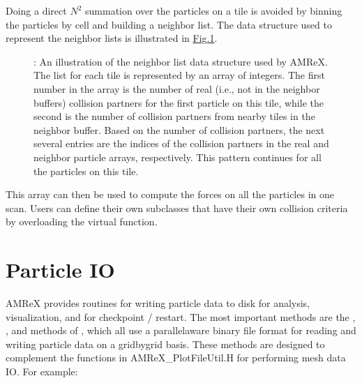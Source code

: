 \documentclass[letterpaper,10pt,english]{sphinxmanual}
\begin{document}
\sphinxAtStartPar
Doing a direct \(N^2\) summation over the
particles on a tile is avoided by binning the particles by cell and building a neighbor
list.  The data structure used to represent
the neighbor lists is illustrated in \hyperref[\detokenize{Particle:fig-particles-neighbor-list}]{Fig.\@ \ref{\detokenize{Particle:fig-particles-neighbor-list}}}.

\begin{center}

\begin{figure}[htbp]
\centering
\capstart

\noindent{}
\caption{: An illustration of the neighbor list data structure used by AMReX. The
list for each tile is represented by an array of integers. The first number
in the array is the number of real (i.e., not in the neighbor buffers)
collision partners for the first particle on this tile, while the second is
the number of collision partners from nearby tiles in the neighbor buffer.
Based on the number of collision partners, the next several entries are the
indices of the collision partners in the real and neighbor particle arrays,
respectively. This pattern continues for all the particles on this tile.}\label{\detokenize{Particle:id9}}\label{\detokenize{Particle:fig-particles-neighbor-list}}\end{figure}

\end{center}

\sphinxAtStartPar
This array can then be used to compute the forces on all the particles in one
scan. Users can define their own  subclasses
that have their own collision criteria by overloading the virtual
 function.


\section{Particle IO}
\label{\detokenize{Particle:particle-io}}\label{\detokenize{Particle:sec-particles-io}}
\sphinxAtStartPar
AMReX provides routines for writing particle data to disk for analysis,
visualization, and for checkpoint / restart. The most important methods are the
, , and  methods of
, which all use a parallel\sphinxhyphen{}aware binary file format for
reading and writing particle data on a grid\sphinxhyphen{}by\sphinxhyphen{}grid basis. These methods are
designed to complement the functions in AMReX\_PlotFileUtil.H for performing
mesh data IO. For example:
\end{document}
